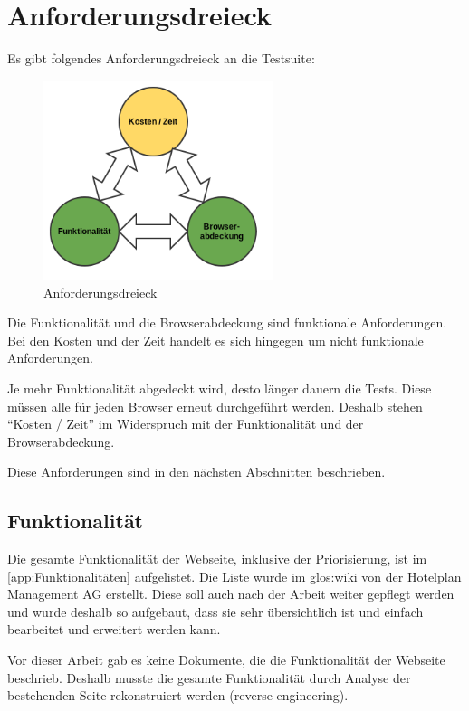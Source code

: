 \section{Anforderungsdreieck}
Es gibt folgendes Anforderungsdreieck an die Testsuite:
\begin{figure}[H]
	\centering
	\includegraphics[width=0.6\textwidth]{images/triangle.png}
	\caption{Anforderungsdreieck}
	\label{fig:analyse:Anforderungsdreieck}
\end{figure}
Die Funktionalität und die Browserabdeckung sind funktionale Anforderungen. Bei den Kosten und der Zeit handelt es sich hingegen um nicht funktionale Anforderungen.

Je mehr Funktionalität abgedeckt wird, desto länger dauern die Tests. Diese müssen alle für jeden Browser erneut durchgeführt werden. Deshalb stehen "`Kosten / Zeit"' im Widerspruch mit der Funktionalität und der Browserabdeckung.

Diese Anforderungen sind in den nächsten Abschnitten beschrieben.

\subsection{Funktionalität}
\label{sec:analyse:Funktionalität}
Die gesamte Funktionalität der Webseite, inklusive der Priorisierung, ist im \cref{app:Funktionalitäten}  aufgelistet. Die Liste wurde im \Gls{glos:wiki} von der Hotelplan Management AG erstellt. Diese soll auch nach der Arbeit weiter gepflegt werden und wurde deshalb so aufgebaut, dass sie sehr übersichtlich ist und einfach bearbeitet und erweitert werden kann.

Vor dieser Arbeit gab es keine Dokumente, die die Funktionalität der Webseite beschrieb. Deshalb musste die gesamte Funktionalität durch Analyse der bestehenden Seite rekonstruiert werden (reverse engineering).

